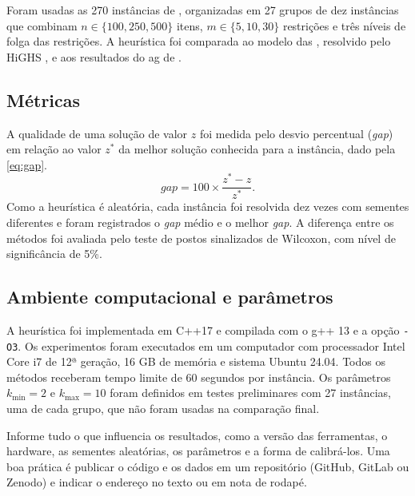 Foram usadas as 270 instâncias de \textcite{chu1998genetic}, organizadas em
27 grupos de dez instâncias que combinam $n \in \{100, 250, 500\}$ itens,
$m \in \{5, 10, 30\}$ restrições e três níveis de folga das restrições. A
heurística foi comparada ao modelo das
, resolvido pelo HiGHS
\cite{huangfu2018parallelizing}, e aos resultados do \acs{ag} de
\textcite{chu1998genetic}.

\subsection{Métricas}

A qualidade de uma solução de valor $z$ foi medida pelo desvio percentual
(\emph{gap}) em relação ao valor $z^*$ da melhor solução conhecida para a
instância, dado pela \cref{eq:gap}.
\begin{equation}
  \mathit{gap} = 100 \times \frac{z^* - z}{z^*}.
  \label{eq:gap}
\end{equation}
Como a heurística é aleatória, cada instância foi resolvida dez vezes com
sementes diferentes e foram registrados o \emph{gap} médio e o melhor
\emph{gap}. A diferença entre os métodos foi avaliada pelo teste de postos
sinalizados de Wilcoxon, com nível de significância de 5\%.

\subsection{Ambiente computacional e parâmetros}

A heurística foi implementada em C++17 e compilada com o g++ 13 e a opção
\texttt{-O3}. Os experimentos foram executados em um computador com processador
Intel Core i7 de 12ª geração, 16 GB de memória e sistema Ubuntu 24.04. Todos
os métodos receberam tempo limite de 60 segundos por instância. Os parâmetros
$k_{\min} = 2$ e $k_{\max} = 10$ foram definidos em testes preliminares com 27
instâncias, uma de cada grupo, que não foram usadas na comparação final.

\begin{instrucao}
Informe tudo o que influencia os resultados, como a versão das ferramentas,
o hardware, as sementes aleatórias, os parâmetros e a forma de calibrá-los. Uma
boa prática é publicar o código e os dados em um repositório (GitHub, GitLab
ou Zenodo) e indicar o endereço no texto ou em nota de rodapé.
\end{instrucao}

